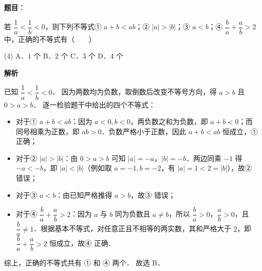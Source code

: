 \begin{answer}

\textbf{题目}：

若 $\dfrac{1}{a} < \dfrac{1}{b} < 0$，则下列不等式① $a + b < ab$；② $|a| > |b|$；③ $a < b$；④ $\dfrac{b}{a} + \dfrac{a}{b} > 2$ 中，正确的不等式有\mbox{（　　）}

\begin{gkopts}(4)
\task A．$1$ 个
\task B．$2$ 个
\task C．$3$ 个
\task D．$4$ 个
\end{gkopts}

\textbf{解析}

已知 $\dfrac{1}{a} < \dfrac{1}{b} < 0$．
因为两数均为负数，取倒数后改变不等号方向，得 $a > b$ 且 $0 > a > b$．
逐一检验题干中给出的四个不等式：
\begin{itemize}
\item 对于① $a + b < ab$：因为 $a < 0, b < 0$，两负数之和为负数，即 $a + b < 0$；而同号相乘为正数，即 $ab > 0$．负数严格小于正数，因此 $a + b < ab$ 恒成立，① 正确；
\item 对于② $|a| > |b|$：由 $0 > a > b$ 可知 $|a| = -a$，$|b| = -b$．两边同乘 $-1$ 得 $-a < -b$，即 $|a| < |b|$（例如取 $a = -1, b = -2$，有 $|a| = 1 < 2 = |b|$），故② 错误；
\item 对于③ $a < b$：由已知严格推得 $a > b$，故③ 错误；
\item 对于④ $\dfrac{b}{a} + \dfrac{a}{b} > 2$：因为 $a$ 与 $b$ 同为负数且 $a \neq b$，所以 $\dfrac{b}{a} > 0$，$\dfrac{a}{b} > 0$，且 $\dfrac{b}{a} \neq 1$．根据基本不等式，对任意正且不相等的两实数，其和严格大于 $2$，即 $\dfrac{b}{a} + \dfrac{a}{b} > 2$ 恒成立，故④ 正确．
\end{itemize}
综上，正确的不等式共有 ① 和 ④ 两个．
故选 B．


\end{answer}
